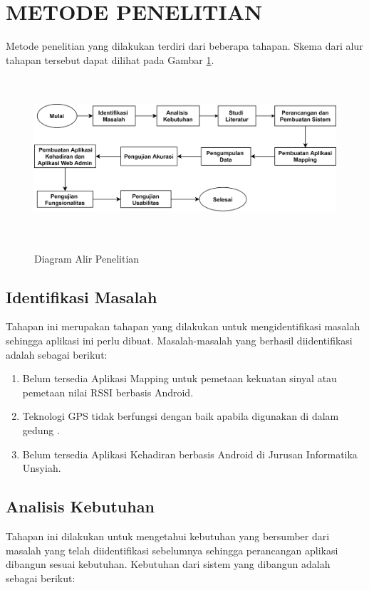 \section{\uppercase{METODE PENELITIAN}}
Metode penelitian yang dilakukan terdiri dari beberapa tahapan. Skema dari alur tahapan tersebut dapat dilihat pada Gambar \ref{metpen}.
\begin{figure}[H]
\centering
{\includegraphics [width = 14cm, height= 6cm]{gambar/diagram-alir-penelitian}}
\caption{Diagram Alir Penelitian}
\label{metpen}
\end{figure}

\fancyhf{} 
\fancyfoot[R]{\thepage}

\subsection{Identifikasi Masalah}
Tahapan ini merupakan tahapan yang dilakukan untuk mengidentifikasi masalah sehingga aplikasi ini perlu dibuat. Masalah-masalah yang berhasil diidentifikasi adalah sebagai berikut:
\begin{enumerate}[1.]
\itemsep0em
\item Belum tersedia Aplikasi Mapping untuk pemetaan kekuatan sinyal atau pemetaan nilai RSSI berbasis Android. 
\item Teknologi GPS tidak berfungsi dengan baik apabila digunakan di dalam gedung \citep{Keluza2017}.
\item Belum tersedia Aplikasi Kehadiran berbasis Android di Jurusan Informatika Unsyiah.
\end{enumerate}

\subsection{Analisis Kebutuhan}
Tahapan ini dilakukan untuk mengetahui kebutuhan yang bersumber dari masalah yang telah diidentifikasi sebelumnya sehingga perancangan aplikasi dibangun sesuai kebutuhan. Kebutuhan dari sistem yang dibangun adalah sebagai berikut:


